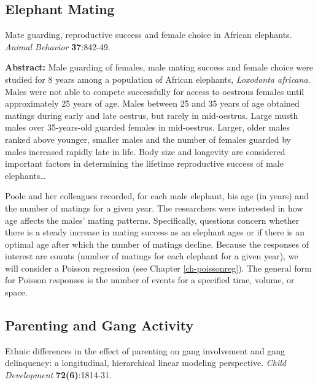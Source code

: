 \documentclass[
]{krantz}
\renewenvironment{quote}{\begin{VF}}{\end{VF}}
\begin{document}
\hypertarget{elephant-mating}{%
\subsection{Elephant Mating}\label{elephant-mating}}

\citet{Poole1989} Mate guarding, reproductive success and female choice in African elephants. \emph{Animal Behavior} \textbf{37}:842-49.

\begin{quote}
\textbf{Abstract:} Male guarding of females, male mating success and female choice were studied for 8 years among a population of African elephants, \emph{Loxodonta africana}. Males were not able to compete successfully for access to oestrous females until approximately 25 years of age. Males between 25 and 35 years of age obtained matings during early and late oestrus, but rarely in mid-oestrus. Large musth males over 35-years-old guarded females in mid-oestrus. Larger, older males ranked above younger, smaller males and the number of females guarded by males increased rapidly late in life. Body size and longevity are considered important factors in determining the lifetime reproductive success of male elephants\ldots{}
\end{quote}

Poole and her colleagues recorded, for each male elephant, his age (in years) and the number of matings for a given year. The researchers were interested in how age affects the males' mating patterns. Specifically, questions concern whether there is a steady increase in mating success as an elephant ages or if there is an optimal age after which the number of matings decline. Because the responses of interest are counts (number of matings for each elephant for a given year), we will consider a Poisson regression (see Chapter \ref{ch-poissonreg}). The general form for Poisson responses is the number of events for a specified time, volume, or space.

\hypertarget{parenting-and-gang-activity}{%
\subsection{Parenting and Gang Activity}\label{parenting-and-gang-activity}}

\citet{Walker-Barnes2001} Ethnic differences in the effect of parenting on gang involvement and gang delinquency: a longitudinal, hierarchical linear modeling perspective. \emph{Child Development} \textbf{72(6)}:1814-31.
\end{document}
